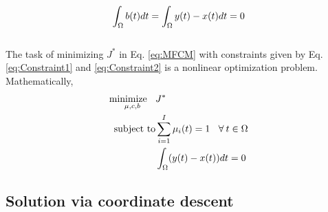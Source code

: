 \documentclass{llncs}
\begin{document}
\begin{equation}
\label{eq:Constraint2}
 \int_\Omega b(t) dt = \int_\Omega y(t) - x(t) dt = 0
\\
\end{equation}
\\
The task of minimizing $J^*$ in Eq. \ref{eq:MFCM} with constraints given by Eq. \ref{eq:Constraint1} and \ref{eq:Constraint2} is a nonlinear optimization problem. Mathematically,
\begin{equation*}
\begin{aligned}
\underset{\mu,c,b}{\text{minimize\:\:\:\:}}
& J^* \\
\text{subject to} &
\sum_{i=1}^{I}{\mu_{i}(t)}=1 \: \:\:\: \forall \: t \in \Omega
\\
&  \int_\Omega (y(t) - x(t)) dt = 0
\end{aligned}
\end{equation*} 

\subsection{Solution via coordinate descent}
\end{document}
